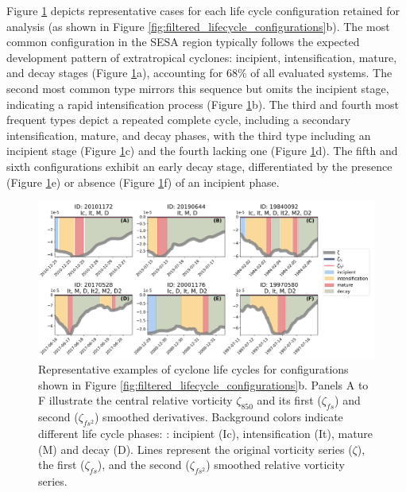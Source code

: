 Figure \ref{fig:representative_life_cycles} depicts representative cases for each life cycle configuration retained for analysis (as shown in Figure \ref{fig:filtered_lifecycle_configurations}b). The most common configuration in the SESA region typically follows the expected development pattern of extratropical cyclones: incipient, intensification, mature, and decay stages (Figure \ref{fig:representative_life_cycles}a), accounting for 68\% of all evaluated systems. The second most common type mirrors this sequence but omits the incipient stage, indicating a rapid intensification process (Figure \ref{fig:representative_life_cycles}b). The third and fourth most frequent types depict a repeated complete cycle, including a secondary intensification, mature, and decay phases, with the third type including an incipient stage (Figure \ref{fig:representative_life_cycles}c) and the fourth lacking one (Figure \ref{fig:representative_life_cycles}d). The fifth and sixth configurations exhibit an early decay stage, differentiated by the presence (Figure \ref{fig:representative_life_cycles}e) or absence (Figure \ref{fig:representative_life_cycles}f) of an incipient phase.

\begin{figure}[h!]
\centering
\includegraphics[width=\textwidth]{figs_4/main_species_life-cycle.png}
\caption[Cyclone Life Cycles - Representative Examples]{Representative examples of cyclone life cycles for configurations shown in Figure \ref{fig:filtered_lifecycle_configurations}b. Panels A to F illustrate the central relative vorticity \(\zeta_{850}\) and its first (\(\zeta_{fs}\)) and second (\(\zeta_{fs^2}\)) smoothed derivatives. Background colors indicate different life cycle phases: : incipient (Ic), intensification (It), mature (M) and decay (D). Lines represent the original vorticity series (\(\zeta\)), the first (\(\zeta_{fs}\)), and the second (\(\zeta_{fs^2}\)) smoothed relative vorticity series.}
\label{fig:representative_life_cycles}
\end{figure}

